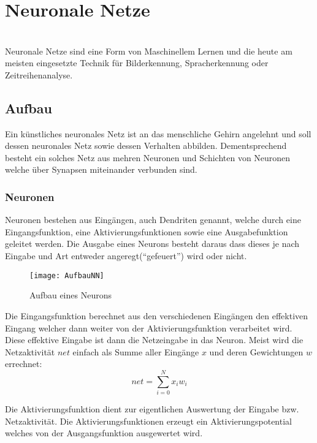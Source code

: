     \section{Neuronale Netze}
    \cite[Vgl. im Folgenden]{EinfuehrunginNN,WissensbasierteSysteme}\\
    Neuronale Netze sind eine Form von Maschinellem Lernen und die heute am meisten eingesetzte Technik für Bilderkennung, Spracherkennung oder Zeitreihenanalyse.
    
    \subsection{Aufbau}
    Ein künstliches neuronales Netz ist an das menschliche Gehirn angelehnt und soll dessen neuronales Netz sowie dessen Verhalten abbilden. 
    Dementsprechend besteht ein solches Netz aus mehren Neuronen und Schichten von Neuronen welche über Synapsen miteinander verbunden sind.


    \subsubsection{Neuronen}
    Neuronen bestehen aus Eingängen, auch Dendriten genannt, welche durch eine Eingangsfunktion, eine Aktivierungsfunktionen sowie eine Ausgabefunktion geleitet werden.
    Die Ausgabe eines Neurons besteht daraus dass dieses je nach Eingabe und Art entweder angeregt("`gefeuert"') wird oder nicht.
    
    \begin{figure}[H]
        \centering
        \texttt{[image: AufbauNN]}
        \caption{Aufbau eines Neurons}
        \label{fig:AufbauNN}
    \end{figure}
    
    \noindent
    Die Eingangsfunktion berechnet aus den verschiedenen Eingängen den effektiven Eingang welcher dann weiter von der Aktivierungsfunktion verarbeitet wird.
    Diese effektive Eingabe ist dann die Netzeingabe in das Neuron.
    Meist wird die Netzaktivität \(net\) einfach als Summe aller Eingänge \(x\) und deren Gewichtungen \(w\) errechnet:
    \begin{equation}
        net = \sum_{i=0}^N x_i w_i
    \end{equation}
    \newline

    \noindent
    Die Aktivierungsfunktion dient zur eigentlichen Auswertung der Eingabe bzw. Netzaktivität.
    Die Aktivierungsfunktionen erzeugt ein Aktivierungspotential welches von der Ausgangsfunktion ausgewertet wird.
    \newline
    
